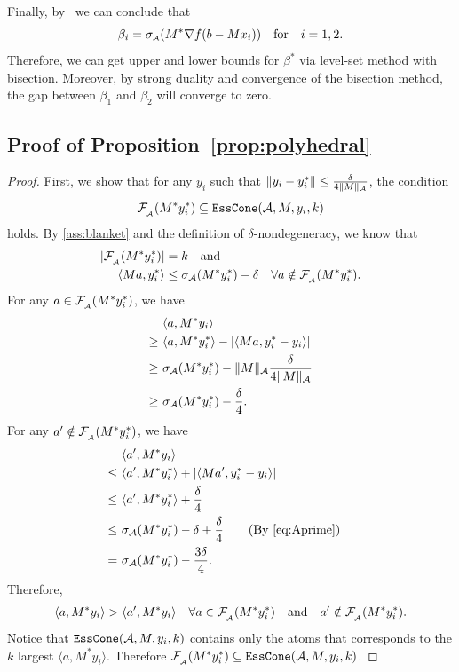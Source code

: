 Finally, by~\cite[Theorem~5.1]{fan2019alignment} we can conclude that 
\[\beta_i = \sigma_{\scriptscriptstyle\mathcal{A}}(M^*\nabla f(b - Mx_i)) \hbox{\quad for\quad} i = 1,2.\]
Therefore, we can get upper and lower bounds for $\beta^*$ via level-set method with bisection. Moreover, by strong duality and convergence of the bisection method, the gap between $\beta_1$ and $\beta_2$ will converge to zero. 

\subsection{Proof of Proposition~\ref{prop:polyhedral}}
\label{app:prop_proof}
\begin{proof}
  First, we show that for any $y_i$ such that $\| y_i - y_i^* \| \leq \frac{\delta}{4\| M \|_{\mathcal{A}}}$, the condition 
  \[\mathcal{F}_{\scriptscriptstyle _{\scriptscriptstyle\mathcal{A}}}( M^* y_i^*) \subseteq \texttt{EssCone}(\mathcal{A}, M, y_i, k)\]
  holds. By \autoref{ass:blanket} and the definition of $\delta$-nondegeneracy, we know that 
  \begin{equation} \label{eq:Aprime}
  \begin{split}
    |  \mathcal{F}_{\scriptscriptstyle _{\scriptscriptstyle\mathcal{A}}}( M^* y_i^*) | &= k \hbox{\quad and\quad} \\
    \langle Ma, y_i^* \rangle &\leq \sigma_{\mathcal{A}}( M^* y_i^* ) - \delta \quad \forall a \notin \mathcal{F}_{\scriptscriptstyle _{\scriptscriptstyle\mathcal{A}}}( M^* y_i^*).
  \end{split}
  \end{equation}
  For any $a \in \mathcal{F}_{\scriptscriptstyle _{\scriptscriptstyle\mathcal{A}}}( M^* y_i^*)$, we have
  \begin{align*}
      & \langle a, M^* y_i \rangle \\
      \geq~& \langle a, M^* y_i^* \rangle - | \langle M a, y_i^* - y_i \rangle | \\
      \geq~& \sigma_{\mathcal{A}}( M^* y_i^* ) - \| M \|_{\mathcal{A}} \frac{\delta}{4\|M\|_{\mathcal{A}}} \\
      \geq~& \sigma_{\mathcal{A}}( M^* y_i^* ) - \frac{\delta}{4}.
  \end{align*}
  For any $a' \notin \mathcal{F}_{\scriptscriptstyle _{\scriptscriptstyle\mathcal{A}}}( M^* y_i^*)$, we have 
  \begin{align*}
      & \langle a', M^* y_i \rangle \\
      \leq~ & \langle a', M^* y_i^* \rangle + | \langle M a', y_i^* - y_i \rangle | \\
      \leq~ & \langle a', M^* y_i^* \rangle + \frac{\delta}{4} \\
      \leq~ & \sigma_{\mathcal{A}}( M^* y_i^* ) - \delta + \frac{\delta}{4} \quad \hbox{\quad(By \eqref{eq:Aprime})\quad} \\
      =~& \sigma_{\mathcal{A}}( M^* y_i^* ) - \frac{3\delta}{4}.
  \end{align*}
    Therefore, 
    \begin{align*}
        \langle a, M^* y_i \rangle > \langle a', M^* y_i \rangle  \quad \forall a \in \mathcal{F}_{\scriptscriptstyle _{\scriptscriptstyle\mathcal{A}}}( M^* y_i^*) \hbox{\quad and\quad} a' \notin \mathcal{F}_{\scriptscriptstyle _{\scriptscriptstyle\mathcal{A}}}( M^* y_i^*).
    \end{align*}
    Notice that $\texttt{EssCone}(\mathcal{A}, M, y_i, k)$ contains only the atoms that corresponds to the $k$ largest $\langle a, M^* y_i \rangle$. Therefore $\mathcal{F}_{\scriptscriptstyle _{\scriptscriptstyle\mathcal{A}}}( M^* y_i^*) \subseteq \texttt{EssCone}(\mathcal{A}, M, y_i, k)$.
    

\end{proof}
